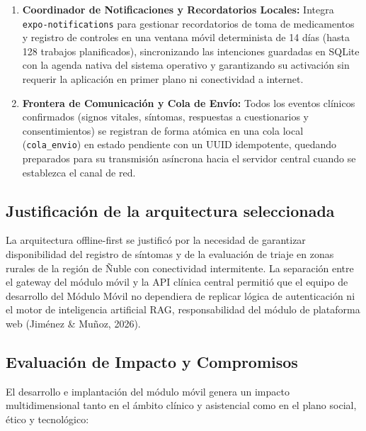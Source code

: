 \begin{enumerate}
    \item \textbf{Coordinador de Notificaciones y Recordatorios Locales:} Integra \texttt{expo-notifications} para gestionar recordatorios de toma de medicamentos y registro de controles en una ventana móvil determinista de 14 días (hasta 128 trabajos planificados), sincronizando las intenciones guardadas en SQLite con la agenda nativa del sistema operativo y garantizando su activación sin requerir la aplicación en primer plano ni conectividad a internet.
    \item \textbf{Frontera de Comunicación y Cola de Envío:} Todos los eventos clínicos confirmados (signos vitales, síntomas, respuestas a cuestionarios y consentimientos) se registran de forma atómica en una cola local (\texttt{cola\_envio}) en estado pendiente con un UUID idempotente, quedando preparados para su transmisión asíncrona hacia el servidor central cuando se establezca el canal de red.
\end{enumerate}

\subsection*{Justificación de la arquitectura seleccionada}

La arquitectura offline-first se justificó por la necesidad de garantizar disponibilidad del registro de síntomas y de la evaluación de triaje en zonas rurales de la región de Ñuble con conectividad intermitente. La separación entre el gateway del módulo móvil y la API clínica central permitió que el equipo de desarrollo del Módulo Móvil no dependiera de replicar lógica de autenticación ni el motor de inteligencia artificial RAG, responsabilidad del módulo de plataforma web (Jiménez \& Muñoz, 2026).

\subsection*{Evaluación de Impacto y Compromisos}

El desarrollo e implantación del módulo móvil genera un impacto multidimensional tanto en el ámbito clínico y asistencial como en el plano social, ético y tecnológico:

